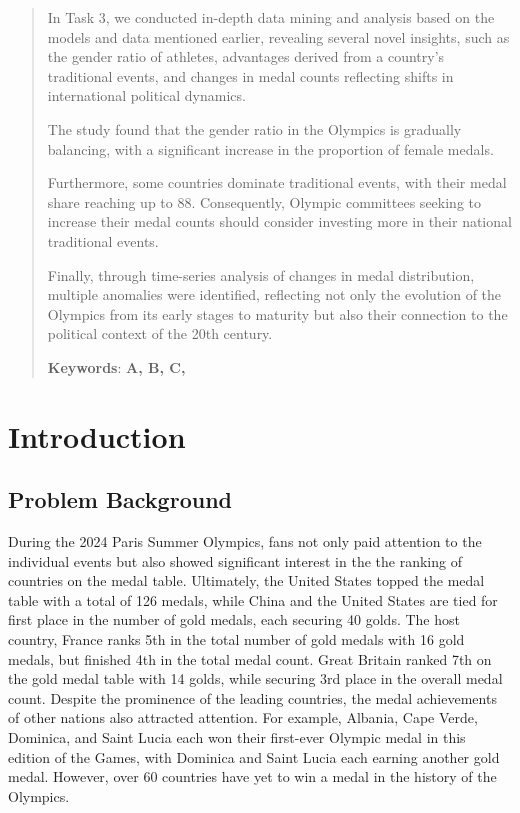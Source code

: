 \documentclass[12pt]{article}  %
\begin{document}
\begin{abstract}
In Task 3, we conducted in-depth data mining and analysis based on the models and data mentioned earlier, revealing several novel insights, such as the gender ratio of athletes, advantages derived from a country's traditional events, and changes in medal counts reflecting shifts in international political dynamics.

The study found that the gender ratio in the Olympics is gradually balancing, with a significant increase in the proportion of female medals.

Furthermore, some countries dominate traditional events, with their medal share reaching up to 88. Consequently, Olympic committees seeking to increase their medal counts should consider investing more in their national traditional events. 

Finally, through time-series analysis of changes in medal distribution, multiple anomalies were identified, reflecting not only the evolution of the Olympics from its early stages to maturity but also their connection to the political context of the 20th century.


    
    
 
 
    \vspace{5pt}
    \textbf{Keywords}: \textbf{ A, B, C,  }
    
	
\end{abstract}

\maketitle  %
\tableofcontents  %


\section{Introduction}
\subsection{Problem Background}
During the 2024 Paris Summer Olympics, fans not only paid attention to the individual events but also showed significant interest in the the ranking of countries on the medal table. Ultimately, the United States topped the medal table with a total of 126 medals, while China and the United States are tied for first place in the number of gold medals, each securing 40 golds. The host country, France ranks 5th in the total number of gold medals with 16 gold medals, but finished 4th in the total medal count. Great Britain ranked 7th on the gold medal table with 14 golds, while securing 3rd place in the overall medal count. Despite the prominence of the leading countries, the medal achievements of other nations also attracted attention. For example, Albania, Cape Verde, Dominica, and Saint Lucia each won their first-ever Olympic medal in this edition of the Games, with Dominica and Saint Lucia each earning another gold medal. However, over 60 countries have yet to win a medal in the history of the Olympics. 
\end{document}
